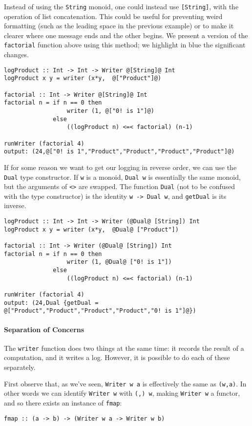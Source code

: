 \documentclass[11	pt]{article}
\theoremstyle{nonumberplain}
\newcommand*\lsin{\lstinline}
\begin{document}
Instead of using the \lsin|String| monoid, one could instead use \mbox{\lsin|[String]|}, with the operation of list concatenation. This could be useful for preventing weird formatting (such as the leading space in the previous example) or to make it clearer where one message ends and the other begins. We present a version of the \lsin|factorial| function above using this method; we highlight in {\color{blue} blue} the significant changes.
\begin{lstlisting}
logProduct :: Int -> Int -> Writer @[String]@ Int
logProduct x y = writer (x*y,  @["Product"]@)

factorial :: Int -> Writer @[String]@ Int
factorial n = if n == 0 then
                  writer (1, @["0! is 1"]@) 
              else
                  ((logProduct n) <=< factorial) (n-1)

runWriter (factorial 4)
output: (24,@["0! is 1","Product","Product","Product","Product"]@)
\end{lstlisting}

If for some reason we want to get our logging in reverse order, we can use the \lsin|Dual| type constructor. If \lsin|w| is a monoid, \lsin|Dual w| is essentially the same monoid, but the arguments of \lsin|<>| are swapped. The function \lsin|Dual| (not to be confused with the type constructor) is the identity \lsin|w -> Dual w|, and \lsin|getDual| is its inverse.
\begin{lstlisting}
logProduct :: Int -> Int -> Writer (@Dual@ [String]) Int
logProduct x y = writer (x*y,  @Dual@ ["Product"])

factorial :: Int -> Writer (@Dual@ [String]) Int
factorial n = if n == 0 then
                  writer (1, @Dual@ ["0! is 1"]) 
              else
                  ((logProduct n) <=< factorial) (n-1)

runWriter (factorial 4)
output: (24,Dual {getDual = @["Product","Product","Product","Product","0! is 1"]@})
\end{lstlisting}

\paragraph{Separation of Concerns}
The \lsin|writer| function does two things at the same time: it records the result of a computation, and it writes a log. However, it is possible to do each of these separately.

First observe that, as we've seen, \lsin|Writer w a| is effectively the same as \lsin|(w,a)|. In other words we can identify \lsin|Writer w| with \lsin|(,) w|, making \lsin|Writer w| a functor, and so there exists an instance of \lsin|fmap|:
\begin{lstlisting}
fmap :: (a -> b) -> (Writer w a -> Writer w b)
\end{lstlisting}
\end{document}
